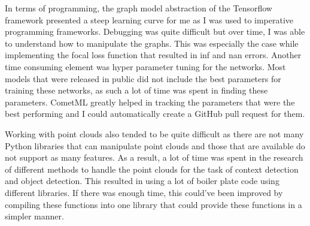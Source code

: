 In terms of programming, the graph model abstraction of the Tensorflow framework presented a steep learning curve for me as I was used to imperative programming frameworks. Debugging was quite difficult but over time, I was able to understand how to manipulate the graphs. This was especially the case while implementing the focal loss function that resulted in inf and nan errors. Another time consuming element was hyper parameter tuning for the networks. Most models that were released in public did not include the best parameters for training these networks, as such a lot of time was spent in finding these parameters. 
CometML greatly helped in tracking the parameters that were the best performing and I could automatically create a GitHub pull request for them. 	

 Working with point clouds also tended to be quite difficult as there are not many Python libraries that can manipulate point clouds and those that are available do not support as many features. As a result, a lot of time was spent in the research of different methods to handle the point clouds for the task of context detection and object detection. This resulted in using a lot of boiler plate code using different libraries. If there was enough time, this could've been improved by compiling these functions into one library that could provide these functions in a simpler manner. 
 